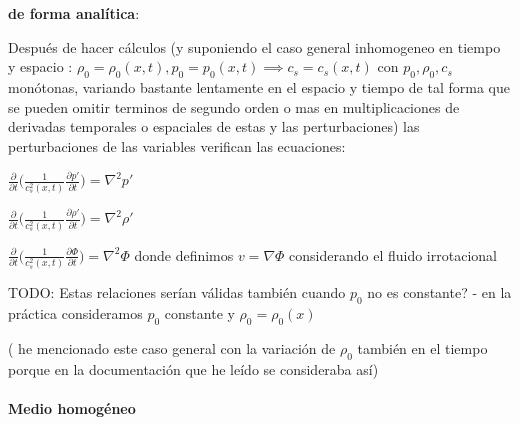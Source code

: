 \documentclass{article}
\begin{document}
\textbf{de forma analítica}:

\begin{description}  



\item Después de hacer cálculos (y suponiendo el caso general inhomogeneo en tiempo y espacio : 
$\rho_0 = \rho_0(x,t),p_0 = p_0(x,t) \implies c_s = c_s(x,t)$ 
con  $p_0, \rho_0, c_s$  monótonas, variando bastante lentamente en el espacio y tiempo de tal forma que se pueden omitir terminos de segundo orden o mas en multiplicaciones de derivadas temporales o espaciales de estas y las perturbaciones) las perturbaciones de las variables verifican las ecuaciones: 

\item $\frac{\partial}{\partial t} \big(\frac{1}{c_s^{2}(x,t)} \frac{\partial p\prime}{\partial t}\big) = \nabla^{2} p\prime    $
\item $\frac{\partial}{\partial t} \big(\frac{1}{c_s^{2}(x,t)} \frac{\partial \rho\prime}{\partial t}\big) = \nabla^{2} \rho\prime    $
\item $\frac{\partial}{\partial t} \big(\frac{1}{c_s^{2}(x,t)} \frac{\partial \Phi}{\partial t}\big) = \nabla^{2} \Phi $ donde definimos  $v = \nabla \Phi$ considerando el fluido irrotacional
\item TODO: Estas relaciones serían válidas también cuando $p_0$ no es constante? - en la práctica consideramos $p_0$ constante y $\rho_0 = \rho_0(x)$
\item(
{\small{he mencionado este caso general con la variación de $\rho_0$ también  en el tiempo 
porque en la documentación que he leído se consideraba así}})

\end{description}  

\paragraph{Medio homogéneo}
\end{document}
